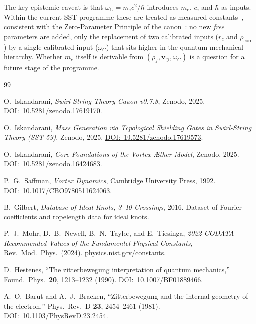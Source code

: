 \documentclass[11pt,a4paper]{article}
\newcommand{\rc}{r_c}
\newcommand{\vswirl}{\mathbf{v}_{\scriptscriptstyle\boldsymbol{\circlearrowleft}}}
\newcommand{\rhof}{\rho_{\!f}}
\newcommand{\rhocore}{\rho_{\!\mathrm{core}}}
\newcommand{\omC}{\omega_C}
\begin{document}
The key epistemic caveat is that $\omC=m_ec^2/\hbar$
introduces $m_e$, $c$, and $\hbar$ as inputs.  Within the current
SST programme these are treated as measured
constants~\cite{MohrTaylor2016}, consistent with the
Zero-Parameter Principle of the canon~\cite{IskandaraniCanon078}:
no new \emph{free} parameters are added, only the replacement of
two calibrated inputs ($\rc$ and $\rhocore$) by a single calibrated
input ($\omC$) that sits higher in the quantum-mechanical hierarchy.
Whether $m_e$ itself is derivable from $(\rhof,\vswirl,\omC)$ is a
question for a future stage of the programme.

\begin{thebibliography}{99}

O.~Iskandarani,
\textit{Swirl-String Theory Canon v0.7.8},
Zenodo, 2025.
\href{https://doi.org/10.5281/zenodo.17619170}{DOI:~10.5281/zenodo.17619170}.

O.~Iskandarani,
\textit{Mass Generation via Topological Shielding Gates in
Swirl-String Theory (SST-59)},
Zenodo, 2025.
\href{https://doi.org/10.5281/zenodo.17619573}{DOI:~10.5281/zenodo.17619573}.

O.~Iskandarani,
\textit{Core Foundations of the Vortex \AE{}ther Model},
Zenodo, 2025.
\href{https://doi.org/10.5281/zenodo.16424683}{DOI:~10.5281/zenodo.16424683}.

P.~G.~Saffman,
\textit{Vortex Dynamics},
Cambridge University Press, 1992.
\href{https://doi.org/10.1017/CBO9780511624063}{DOI:~10.1017/CBO9780511624063}.

B.~Gilbert,
\textit{Database of Ideal Knots, 3--10 Crossings},
2016.
Dataset of Fourier coefficients and ropelength data for ideal knots.

P.~J.~Mohr, D.~B.~Newell, B.~N.~Taylor, and E.~Tiesinga,
\textit{2022 CODATA Recommended Values of the Fundamental
Physical Constants},
Rev.\ Mod.\ Phys.\ (2024).
\href{https://physics.nist.gov/constants}{physics.nist.gov/constants}.

D.~Hestenes,
``The zitterbewegung interpretation of quantum mechanics,''
Found.\ Phys.\ \textbf{20}, 1213--1232 (1990).
\href{https://doi.org/10.1007/BF01889466}{DOI:~10.1007/BF01889466}.

A.~O.~Barut and A.~J.~Bracken,
``Zitterbewegung and the internal geometry of the electron,''
Phys.\ Rev.\ D \textbf{23}, 2454--2461 (1981).
\href{https://doi.org/10.1103/PhysRevD.23.2454}{DOI:~10.1103/PhysRevD.23.2454}.


\end{thebibliography}
\end{document}
